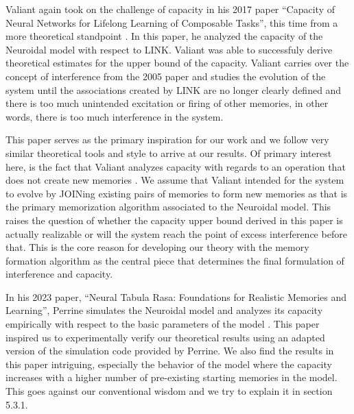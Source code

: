 Valiant again took on the challenge of capacity in his 2017 paper ``Capacity of Neural Networks for Lifelong Learning of Composable Tasks'', this time from a more theoretical standpoint \cite{valiant2017capacity}. In this paper, he analyzed the capacity of the Neuroidal model with respect to LINK. Valiant was able to successfuly derive theoretical estimates for the upper bound of the capacity. Valiant carries over the concept of interference from the 2005 paper and studies the evolution of the system until the associations created by LINK are no longer clearly defined and there is too much unintended excitation or firing of other memories, in other words, there is too much interference in the system. 

This paper serves as the primary inspiration for our work and we follow very similar theoretical tools and style to arrive at our results. Of primary interest here, is the fact that Valiant analyzes capacity with regards to an operation that does not create new memories \cite{valiant2017capacity}. We assume that Valiant intended for the system to evolve by JOINing existing pairs of memories to form new memories as that is the primary memorization algorithm associated to the Neuroidal model. This raises the question of whether the capacity upper bound derived in this paper is actually realizable or will the system reach the point of excess interference before that. This is the core reason for developing our theory with the memory formation algorithm as the central piece that determines the final formulation of interference and capacity.

In his 2023 paper, ``Neural Tabula Rasa: Foundations for Realistic Memories and Learning'', Perrine simulates the Neuroidal model and analyzes its capacity empirically with respect to the basic parameters of the model \cite{perrine2023neural}. This paper inspired us to experimentally verify our theoretical results using an adapted version of the simulation code provided by Perrine. We also find the results in this paper intriguing, especially the behavior of the model where the capacity increases with a higher number of pre-existing starting memories in the model. This goes against our conventional wisdom and we try to explain it in section 5.3.1.

